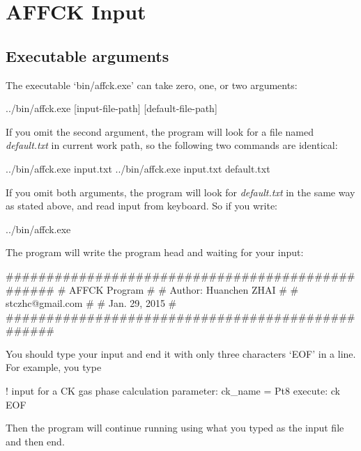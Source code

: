 \documentclass[11pt]{book}
\begin{document}
\chapter{AFFCK Input}

\section{Executable arguments}

The executable `bin/affck.exe' can take zero, one, or two arguments:

\begin{everbatim}
../bin/affck.exe [input-file-path] [default-file-path]
\end{everbatim}

If you omit the second argument, the program will look for a file named \emph{default.txt} in current work path, 
so the following two commands are identical:

\begin{everbatim}
../bin/affck.exe input.txt
../bin/affck.exe input.txt default.txt
\end{everbatim}

If you omit both arguments, the program will look for \emph{default.txt} in the same way as stated above, and 
read input from keyboard. So if you write:

\begin{everbatim}
../bin/affck.exe
\end{everbatim}

The program will write the program head and waiting for your input:

\begin{everbatim}
#################################################
#                AFFCK Program                  #
#             Author: Huanchen ZHAI             #
#               stczhc@gmail.com                #
#                Jan. 29, 2015                  #
#################################################

\end{everbatim}

You should type your input and end it with only three characters `EOF' in a line. For example, you type

\begin{everbatim}
! input for a CK gas phase calculation
{ parameter: ck_name = Pt8 }
{ execute: ck }
EOF
\end{everbatim}

Then the program will continue running using what you typed as the input file and then end.
\end{document}
